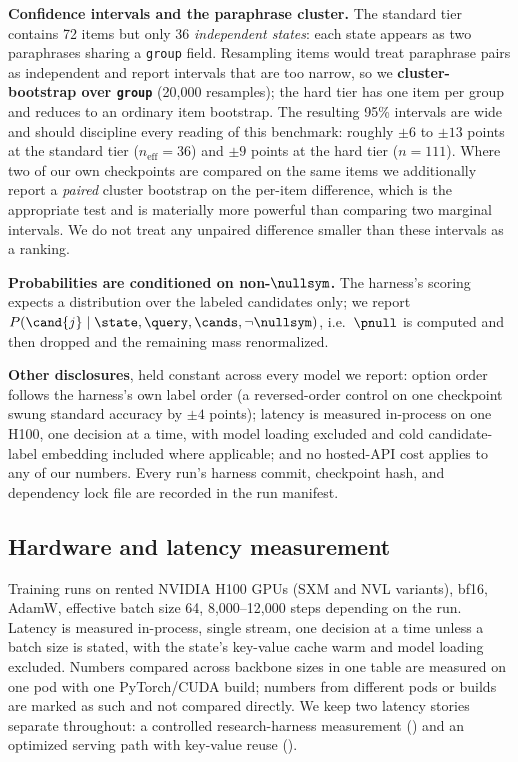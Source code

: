 \textbf{Confidence intervals and the paraphrase cluster.} The standard tier contains 72 items but only
36 \emph{independent states}: each state appears as two paraphrases sharing a \texttt{group} field.
Resampling items would treat paraphrase pairs as independent and report intervals that are too narrow,
so we \textbf{cluster-bootstrap over \texttt{group}} (20{,}000 resamples); the hard tier has one item per
group and reduces to an ordinary item bootstrap. The resulting 95\% intervals are wide and should
discipline every reading of this benchmark: roughly $\pm6$ to $\pm13$ points at the standard tier
($n_{\mathrm{eff}}{=}36$) and $\pm9$ points at the hard tier ($n{=}111$). Where two of our own
checkpoints are compared on the same items we additionally report a \emph{paired} cluster bootstrap on
the per-item difference, which is the appropriate test and is materially more powerful than comparing
two marginal intervals. We do not treat any unpaired difference smaller than these intervals as a
ranking.

\textbf{Probabilities are conditioned on non-$\nullsym$.} The harness's scoring expects a distribution
over the labeled candidates only; we report $P(\cand{j} \mid \state, \query, \cands, \neg\nullsym)$, i.e.\
$\pnull$ is computed and then dropped and the remaining mass renormalized.

\textbf{Other disclosures}, held constant across every model we report: option order follows the
harness's own label order (a reversed-order control on one checkpoint swung standard accuracy by $\pm 4$
points); latency is measured in-process on one H100, one decision at a time, with model loading excluded
and cold candidate-label embedding included where applicable; and no hosted-API cost applies to any of
our numbers. Every run's harness commit, checkpoint hash, and dependency lock file are recorded in the
run manifest.

\subsection{Hardware and latency measurement}
\label{sec:experiments:hardware}

Training runs on rented NVIDIA H100 GPUs (SXM and NVL variants), bf16, AdamW, effective batch size 64,
8{,}000--12{,}000 steps depending on the run. Latency is measured in-process, single stream, one decision
at a time unless a batch size is stated, with the state's key-value cache warm and model loading excluded.
Numbers compared across backbone sizes in one table are measured on one pod with one PyTorch/CUDA
build; numbers from different pods or builds are marked as such and not compared directly. We keep two
latency stories separate throughout: a controlled research-harness measurement
(\Cref{sec:train:latency}) and an optimized serving path with key-value reuse ().

